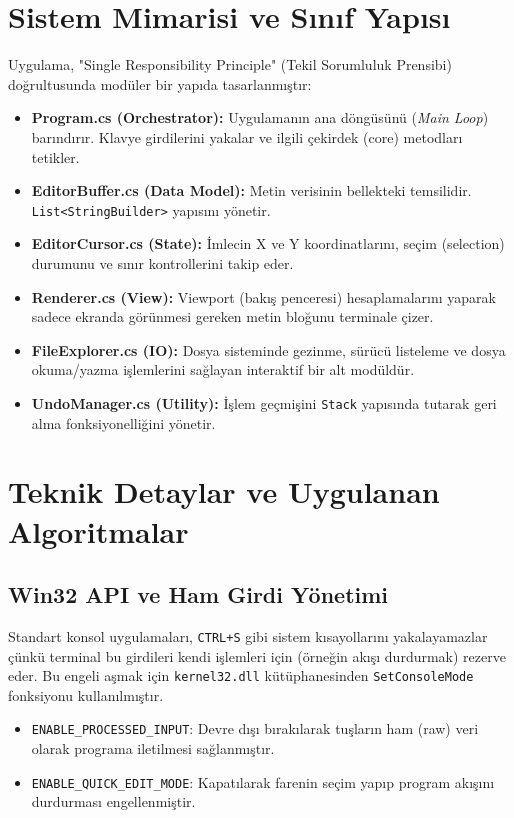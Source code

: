 \documentclass[12pt, conference]{IEEEtran}
\begin{document}
\section{Sistem Mimarisi ve Sınıf Yapısı}
Uygulama, "Single Responsibility Principle" (Tekil Sorumluluk Prensibi) doğrultusunda modüler bir yapıda tasarlanmıştır:

\begin{itemize}
    \item \textbf{Program.cs (Orchestrator):} Uygulamanın ana döngüsünü (\textit{Main Loop}) barındırır. Klavye girdilerini yakalar ve ilgili çekirdek (core) metodları tetikler.
    \item \textbf{EditorBuffer.cs (Data Model):} Metin verisinin bellekteki temsilidir. \texttt{List<StringBuilder>} yapısını yönetir.
    \item \textbf{EditorCursor.cs (State):} İmlecin X ve Y koordinatlarını, seçim (selection) durumunu ve sınır kontrollerini takip eder.
    \item \textbf{Renderer.cs (View):} Viewport (bakış penceresi) hesaplamalarını yaparak sadece ekranda görünmesi gereken metin bloğunu terminale çizer.
    \item \textbf{FileExplorer.cs (IO):} Dosya sisteminde gezinme, sürücü listeleme ve dosya okuma/yazma işlemlerini sağlayan interaktif bir alt modüldür.
    \item \textbf{UndoManager.cs (Utility):} İşlem geçmişini \texttt{Stack} yapısında tutarak geri alma fonksiyonelliğini yönetir.
\end{itemize}

\section{Teknik Detaylar ve Uygulanan Algoritmalar}

\subsection{Win32 API ve Ham Girdi Yönetimi}
Standart konsol uygulamaları, \texttt{CTRL+S} gibi sistem kısayollarını yakalayamazlar çünkü terminal bu girdileri kendi işlemleri için (örneğin akışı durdurmak) rezerve eder. Bu engeli aşmak için \texttt{kernel32.dll} kütüphanesinden \texttt{SetConsoleMode} fonksiyonu kullanılmıştır. 
\begin{itemize}
    \item \texttt{ENABLE\_PROCESSED\_INPUT}: Devre dışı bırakılarak tuşların ham (raw) veri olarak programa iletilmesi sağlanmıştır.
    \item \texttt{ENABLE\_QUICK\_EDIT\_MODE}: Kapatılarak farenin seçim yapıp program akışını durdurması engellenmiştir.
\end{itemize}
\end{document}
